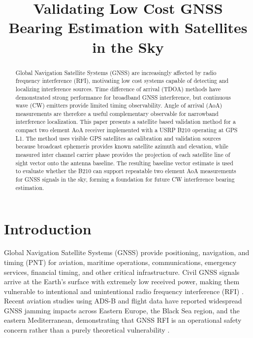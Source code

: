 \documentclass[conference]{IEEEtran}
\begin{document}
\title{Validating Low Cost GNSS Bearing Estimation with Satellites in the Sky}

\author{
}

\maketitle

\begin{abstract}
Global Navigation Satellite Systems (GNSS) are increasingly affected by radio frequency interference (RFI), motivating low cost systems capable of detecting and localizing interference sources. Time difference of arrival (TDOA) methods have demonstrated strong performance for broadband GNSS interference, but continuous wave (CW) emitters provide limited timing observability. Angle of arrival (AoA) measurements are therefore a useful complementary observable for narrowband interference localization. This paper presents a satellite based validation method for a compact two element AoA receiver implemented with a USRP B210 operating at GPS L1. The method uses visible GPS satellites as calibration and validation sources because broadcast ephemeris provides known satellite azimuth and elevation, while measured inter channel carrier phase provides the projection of each satellite line of sight vector onto the antenna baseline. The resulting baseline vector estimate is used to evaluate whether the B210 can support repeatable two element AoA measurements for GNSS signals in the sky, forming a foundation for future CW interference bearing estimation.
\end{abstract}

\section{Introduction}
Global Navigation Satellite Systems (GNSS) provide positioning, navigation, and timing (PNT) for aviation, maritime operations, communications, emergency services, financial timing, and other critical infrastructure. Civil GNSS signals arrive at the Earth's surface with extremely low received power, making them vulnerable to intentional and unintentional radio frequency interference (RFI) \cite{amin2016vulnerabilities,rados2024recent}. Recent aviation studies using ADS-B and flight data have reported widespread GNSS jamming impacts across Eastern Europe, the Black Sea region, and the eastern Mediterranean, demonstrating that GNSS RFI is an operational safety concern rather than a purely theoretical vulnerability \cite{felux2024impacts,figuet2022jamming}.
\end{document}
